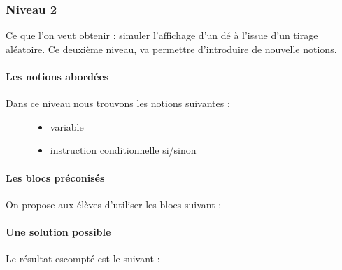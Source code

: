 \documentclass[letterpaper,10pt,french]{sphinxmanual}
\begin{document}


\subsubsection{Niveau 2}
\label{\detokenize{decouverte/de6faces-bloc2::doc}}\label{\detokenize{decouverte/de6faces-bloc2:niveau-2}}
Ce que l’on veut obtenir : simuler l’affichage d’un dé à l’issue d’un tirage aléatoire.
Ce deuxième niveau, va permettre d’introduire de nouvelle notions.


\paragraph{Les notions abordées}
\label{\detokenize{decouverte/de6faces-bloc2:les-notions-abordees}}\begin{description}
\item[{Dans ce niveau nous trouvons les notions suivantes :}] \leavevmode\begin{itemize}
\item {} 
variable

\item {} 
instruction conditionnelle si/sinon

\end{itemize}

\end{description}



\paragraph{Les blocs préconisés}
\label{\detokenize{decouverte/de6faces-bloc2:les-blocs-preconises}}
On propose aux élèves d’utiliser les blocs suivant :



\paragraph{Une solution possible}
\label{\detokenize{decouverte/de6faces-bloc2:une-solution-possible}}
Le résultat escompté est le suivant :
\end{document}
